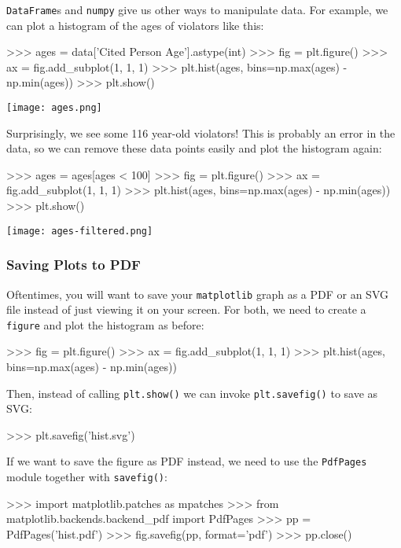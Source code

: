 \texttt{DataFrame}s and \texttt{numpy} give us other ways to manipulate
data. For example, we can plot a histogram of the ages of violators like
this:

\begin{lstlistings}
>>> ages = data['Cited Person Age'].astype(int)
>>> fig = plt.figure()
>>> ax = fig.add_subplot(1, 1, 1)
>>> plt.hist(ages, bins=np.max(ages) - np.min(ages))
>>> plt.show()
\end{lstlistings}

\texttt{[image: ages.png]}

Surprisingly, we see some 116 year-old violators! This is probably an
error in the data, so we can remove these data points easily and plot
the histogram again:

\begin{lstlistings}
>>> ages = ages[ages < 100]
>>> fig = plt.figure()
>>> ax = fig.add_subplot(1, 1, 1)
>>> plt.hist(ages, bins=np.max(ages) - np.min(ages))
>>> plt.show()
\end{lstlistings}

\texttt{[image: ages-filtered.png]}

\subsubsection{Saving Plots to PDF}\label{saving-plots-to-pdf}

Oftentimes, you will want to save your \texttt{matplotlib} graph as a
PDF or an SVG file instead of just viewing it on your screen. For both,
we need to create a \texttt{figure} and plot the histogram as before:

\begin{lstlistings}
>>> fig = plt.figure()
>>> ax = fig.add_subplot(1, 1, 1)
>>> plt.hist(ages, bins=np.max(ages) - np.min(ages))
\end{lstlistings}

Then, instead of calling \texttt{plt.show()} we can invoke
\texttt{plt.savefig()} to save as SVG:

\begin{lstlistings}
>>> plt.savefig('hist.svg')
\end{lstlistings}

If we want to save the figure as PDF instead, we need to use the
\texttt{PdfPages} module together with \texttt{savefig()}:

\begin{lstlistings}
>>> import matplotlib.patches as mpatches
>>> from matplotlib.backends.backend_pdf import PdfPages   
>>> pp = PdfPages('hist.pdf')
>>> fig.savefig(pp, format='pdf')
>>> pp.close()
\end{lstlistings}

